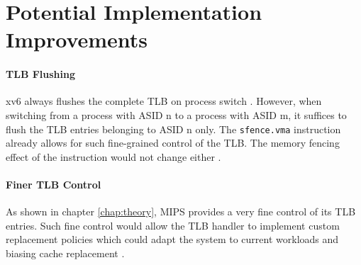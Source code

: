 \section{Potential Implementation Improvements}

\paragraph{TLB Flushing} xv6 always flushes the complete TLB on process switch \cite{cox2011xv6}. However, when switching from a process with ASID n to a process with ASID m, it suffices to flush the TLB entries belonging to ASID n only. The \texttt{sfence.vma} instruction already allows for such fine-grained control of the TLB. The memory fencing effect of the instruction would not change either \cite{RISCVInstructionSet}.

\paragraph{Finer TLB Control} As shown in chapter \ref{chap:theory}, MIPS \cite{MIPSArchitectureProgrammers2016} provides a very fine control of its TLB entries. Such fine control would allow the TLB handler to implement custom replacement policies which could adapt the system to current workloads and biasing cache replacement \cite{park2022every}.


%





%







